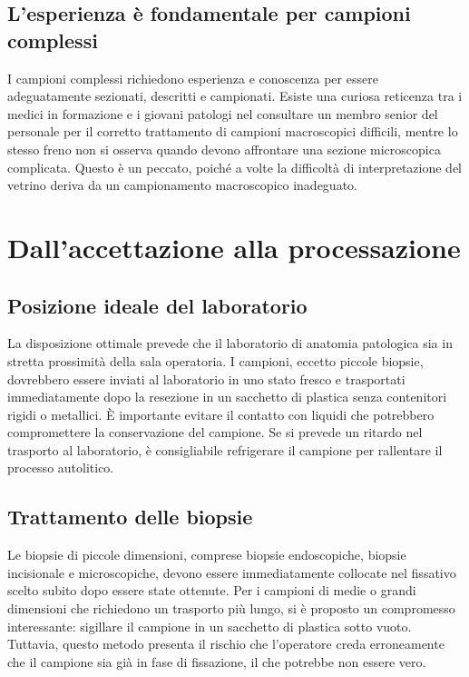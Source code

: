 \subsection{L'esperienza è fondamentale per campioni complessi}
I campioni complessi richiedono esperienza e conoscenza per essere adeguatamente sezionati, descritti e campionati. Esiste una curiosa reticenza tra i medici in formazione e i giovani patologi nel consultare un membro senior del personale per il corretto trattamento di campioni macroscopici difficili, mentre lo stesso freno non si osserva quando devono affrontare una sezione microscopica complicata. Questo è un peccato, poiché a volte la difficoltà di interpretazione del vetrino deriva da un campionamento macroscopico inadeguato.

\section{Dall'accettazione alla processazione}

\subsection{Posizione ideale del laboratorio}
La disposizione ottimale prevede che il laboratorio di anatomia patologica sia in stretta prossimità della sala operatoria. I campioni, eccetto piccole biopsie, dovrebbero essere inviati al laboratorio in uno stato fresco e trasportati immediatamente dopo la resezione in un sacchetto di plastica senza contenitori rigidi o metallici. È importante evitare il contatto con liquidi che potrebbero compromettere la conservazione del campione. Se si prevede un ritardo nel trasporto al laboratorio, è consigliabile refrigerare il campione per rallentare il processo autolitico.


\subsection{Trattamento delle biopsie}
Le biopsie di piccole dimensioni, comprese biopsie endoscopiche, biopsie incisionale e microscopiche, devono essere immediatamente collocate nel fissativo scelto subito dopo essere state ottenute. Per i campioni di medie o grandi dimensioni che richiedono un trasporto più lungo, si è proposto un compromesso interessante: sigillare il campione in un sacchetto di plastica sotto vuoto. Tuttavia, questo metodo presenta il rischio che l'operatore creda erroneamente che il campione sia già in fase di fissazione, il che potrebbe non essere vero.


